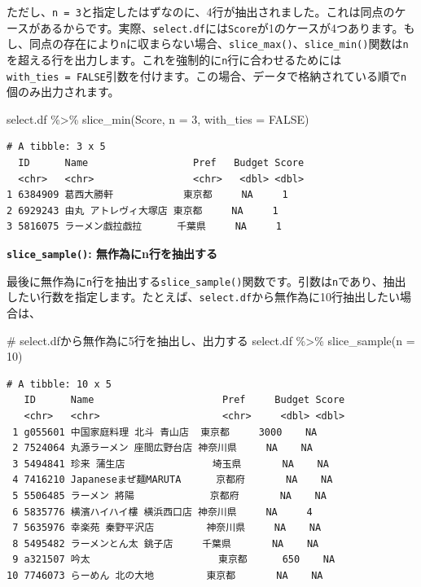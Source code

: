 \documentclass[
  a4paper,
  pandoc,
  ja=standard,
  jafont=haranoaji]{bxjsbook}
\newenvironment{Shaded}{\begin{snugshade}}{\end{snugshade}}
\newcommand{\AttributeTok}[1]{\textcolor[rgb]{0.00,0.48,0.65}{#1}}
\newcommand{\CommentTok}[1]{\textcolor[rgb]{0.37,0.37,0.37}{#1}}
\newcommand{\ConstantTok}[1]{\textcolor[rgb]{0.56,0.35,0.01}{#1}}
\newcommand{\DecValTok}[1]{\textcolor[rgb]{0.68,0.00,0.00}{#1}}
\newcommand{\FunctionTok}[1]{\textcolor[rgb]{0.28,0.35,0.67}{#1}}
\newcommand{\NormalTok}[1]{\textcolor[rgb]{0.00,0.48,0.65}{#1}}
\newcommand{\SpecialCharTok}[1]{\textcolor[rgb]{0.37,0.37,0.37}{#1}}
\begin{document}
ただし、\texttt{n\ =\ 3}と指定したはずなのに、4行が抽出されました。これは同点のケースがあるからです。実際、\texttt{select.df}には\texttt{Score}が1のケースが4つあります。もし、同点の存在により\texttt{n}に収まらない場合、\texttt{slice\_max()}、\texttt{slice\_min()}関数は\texttt{n}を超える行を出力します。これを強制的に\texttt{n}行に合わせるためには\texttt{with\_ties\ =\ FALSE}引数を付けます。この場合、データで格納されている順で\texttt{n}個のみ出力されます。

\begin{Shaded}
\begin{Highlighting}[numbers=left,,]
\NormalTok{select.df }\SpecialCharTok{\%\textgreater{}\%} 
  \FunctionTok{slice\_min}\NormalTok{(Score, }\AttributeTok{n =} \DecValTok{3}\NormalTok{, }\AttributeTok{with\_ties =} \ConstantTok{FALSE}\NormalTok{)}
\end{Highlighting}
\end{Shaded}

\begin{verbatim}
# A tibble: 3 x 5
  ID      Name                  Pref   Budget Score
  <chr>   <chr>                 <chr>   <dbl> <dbl>
1 6384909 葛西大勝軒            東京都     NA     1
2 6929243 由丸 アトレヴィ大塚店 東京都     NA     1
3 5816075 ラーメン戯拉戯拉      千葉県     NA     1
\end{verbatim}

\textbf{\texttt{slice\_sample()}: 無作為にn行を抽出する}

最後に無作為に\texttt{n}行を抽出する\texttt{slice\_sample()}関数です。引数は\texttt{n}であり、抽出したい行数を指定します。たとえば、\texttt{select.df}から無作為に10行抽出したい場合は、

\begin{Shaded}
\begin{Highlighting}[numbers=left,,]
\CommentTok{\# select.dfから無作為に5行を抽出し、出力する}
\NormalTok{select.df }\SpecialCharTok{\%\textgreater{}\%} 
  \FunctionTok{slice\_sample}\NormalTok{(}\AttributeTok{n =} \DecValTok{10}\NormalTok{)}
\end{Highlighting}
\end{Shaded}

\begin{verbatim}
# A tibble: 10 x 5
   ID      Name                      Pref     Budget Score
   <chr>   <chr>                     <chr>     <dbl> <dbl>
 1 g055601 中国家庭料理 北斗 青山店  東京都     3000    NA
 2 7524064 丸源ラーメン 座間広野台店 神奈川県     NA    NA
 3 5494841 珍来 蒲生店               埼玉県       NA    NA
 4 7416210 Japaneseまぜ麺MARUTA      京都府       NA    NA
 5 5506485 ラーメン 將陽             京都府       NA    NA
 6 5835776 横濱ハイハイ樓 横浜西口店 神奈川県     NA     4
 7 5635976 幸楽苑 秦野平沢店         神奈川県     NA    NA
 8 5495482 ラーメンとん太 銚子店     千葉県       NA    NA
 9 a321507 吟太                      東京都      650    NA
10 7746073 らーめん 北の大地         東京都       NA    NA
\end{verbatim}
\end{document}
